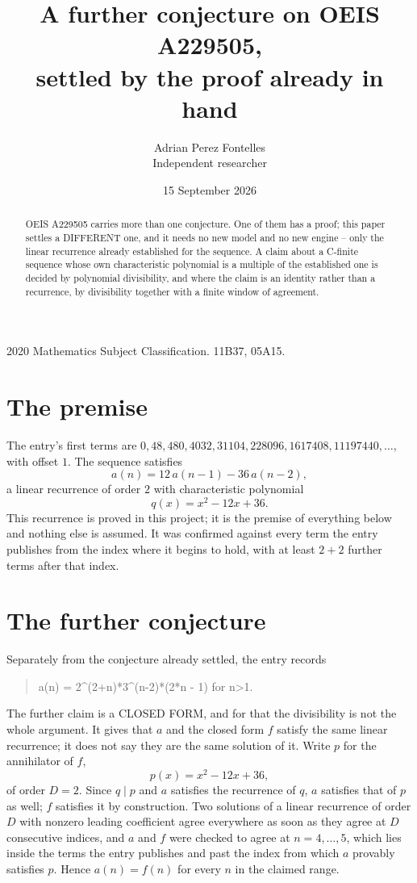 \documentclass[11pt,a4paper]{article}
\title{A further conjecture on OEIS A229505,\\ \large settled by the proof already in hand}
\author{Adrian Perez Fontelles\\ \small Independent researcher}
\date{15 September 2026}
\theoremstyle{plain}
\theoremstyle{definition}
\begin{document}
\maketitle

\begin{abstract}
OEIS A229505 carries more than one conjecture. One of them has a proof; this paper settles a
DIFFERENT one, and it needs no new model and no new engine -- only the linear recurrence already
established for the sequence. A claim about a C-finite sequence whose own characteristic
polynomial is a multiple of the established one is decided by polynomial divisibility, and where
the claim is an identity rather than a recurrence, by divisibility together with a finite window
of agreement.
\end{abstract}

\noindent\small 2020 Mathematics Subject Classification. 11B37, 05A15.\normalsize

\section{The premise}

The entry's first terms are $0, 48, 480, 4032, 31104, 228096, 1617408, 11197440,\dots$, with offset $1$. The sequence satisfies
\[
  a(n)=12\,a(n-1) - 36\,a(n-2) ,
\]
a linear recurrence of order $2$ with characteristic polynomial
\[
  q(x)=x^{2} - 12 x + 36 .
\]
This recurrence is proved in this project; it is the premise of everything below and nothing else is assumed.
It was confirmed against every term the entry publishes from the index where it begins to hold,
with at least $2+2$ further terms after that index.

\section{The further conjecture}

Separately from the conjecture already settled, the entry records

\begin{quote}\raggedright a(n) = 2\^{}(2+n)*3\^{}(n-2)*(2*n - 1) for n>1.\end{quote}

The further claim is a CLOSED FORM, and for that the divisibility is not the whole argument. It
gives that $a$ and the closed form $f$ satisfy the same linear recurrence; it does not say they
are the same solution of it. Write $p$ for the annihilator of $f$,
\[
  p(x)=x^{2} - 12 x + 36 ,
\]
of order $D=2$. Since $q\mid p$ and $a$ satisfies the recurrence of $q$, $a$ satisfies that of
$p$ as well; $f$ satisfies it by construction. Two solutions of a linear recurrence of order $D$
with nonzero leading coefficient agree everywhere as soon as they agree at $D$ consecutive
indices, and $a$ and $f$ were checked to agree at $n=4,\dots,5$,
which lies inside the terms the entry publishes and past the index from which $a$ provably
satisfies $p$. Hence $a(n)=f(n)$ for every $n$ in the claimed range.
\end{document}
